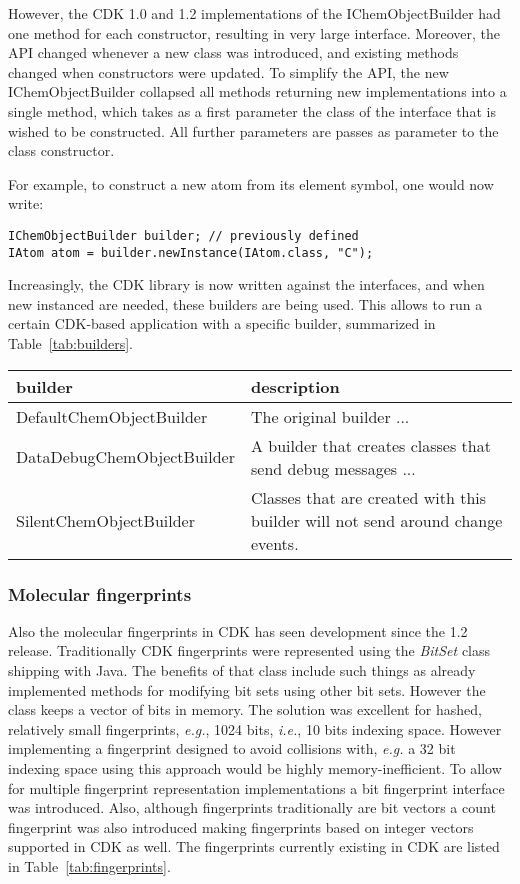 \documentclass[10pt]{bmc_article}
\newenvironment{bmcformat}{\begin{raggedright}\baselineskip20pt\sloppy\setboolean{publ}{false}}{\end{raggedright}\baselineskip20pt\sloppy}
\begin{document}
\begin{bmcformat}
However, the CDK 1.0 and 1.2 implementations of the IChemObjectBuilder had one method for
each constructor, resulting in very large interface. Moreover, the API changed whenever
a new class was introduced, and existing methods changed when constructors were updated.
To simplify the API, the new IChemObjectBuilder collapsed all methods returning new
implementations into a single method, which takes as a first parameter the class of the
interface that is wished to be constructed. All further parameters are passes as
parameter to the class constructor.

For example, to construct a new atom from its element symbol, one would now write:

\begin{verbatim}
IChemObjectBuilder builder; // previously defined
IAtom atom = builder.newInstance(IAtom.class, "C");
\end{verbatim}

Increasingly, the CDK library is now written against the interfaces, and when new instanced
are needed, these builders are being used. This allows to run a certain CDK-based
application with a specific builder, summarized in Table~\ref{tab:builders}.

\begin{table}
\begin{tabular}{l|l}
builder & description \\
\hline
DefaultChemObjectBuilder & The original builder ... \\
DataDebugChemObjectBuilder & A builder that creates classes that send debug messages ... \\
SilentChemObjectBuilder & Classes that are created with this builder will not
    send around change events. \\
\end{tabular}
\end{table}

\subsubsection*{Molecular fingerprints}
Also the molecular fingerprints in CDK has seen development since the 1.2
release. Traditionally CDK fingerprints were represented using the
\textit{BitSet} class shipping with Java. The benefits of that class include
such things as already implemented methods for modifying bit sets using other
bit sets. However the class keeps a vector of bits in memory. The solution was
excellent for hashed, relatively small fingerprints, \textit{e.g.}, 1024 bits,
\textit{i.e.}, 10 bits indexing space. However implementing a fingerprint
designed to avoid collisions with, \textit{e.g.} a 32 bit indexing space using
this approach would be highly memory-inefficient. To allow for multiple
fingerprint representation implementations a bit fingerprint interface was
introduced. Also, although fingerprints traditionally are bit vectors a count
fingerprint was also introduced making fingerprints based on integer vectors
supported in CDK as well. The fingerprints currently existing in CDK are listed
in Table~\ref{tab:fingerprints}.



\end{bmcformat}
\end{document}
